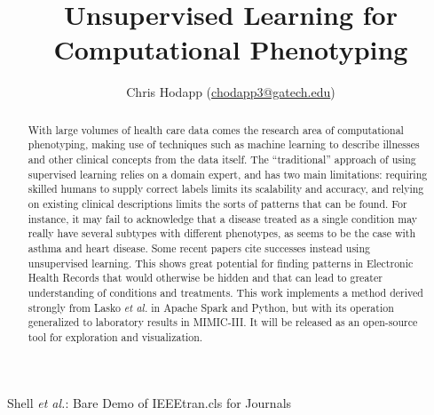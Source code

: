 \documentclass[journal]{IEEEtran}
\begin{document}
%
\title{Unsupervised Learning for Computational Phenotyping}


%
%
%

\author{Chris Hodapp (\url{chodapp3@gatech.edu})
}

%
{Shell \MakeLowercase{\textit{et al.}}: Bare Demo of IEEEtran.cls for Journals}

\maketitle

\begin{abstract}
With large volumes of health care data comes the research area of
computational phenotyping, making use of techniques such as machine
learning to describe illnesses and other clinical concepts from the
data itself.  The ``traditional'' approach of using supervised
learning relies on a domain expert, and has two main limitations:
requiring skilled humans to supply correct labels limits its
scalability and accuracy, and relying on existing clinical
descriptions limits the sorts of patterns that can be found. For
instance, it may fail to acknowledge that a disease treated as a
single condition may really have several subtypes with different
phenotypes, as seems to be the case with asthma and heart
disease. Some recent papers cite successes instead using unsupervised
learning.  This shows great potential for finding patterns in
Electronic Health Records that would otherwise be hidden and that can
lead to greater understanding of conditions and treatments. This work
implements a method derived strongly from Lasko \emph{et
  al.}\cite{Lasko2013} in Apache Spark and Python, but with its
operation generalized to laboratory results in MIMIC-III.  It will be
released as an open-source tool for exploration and visualization.
\end{abstract}
\end{document}
